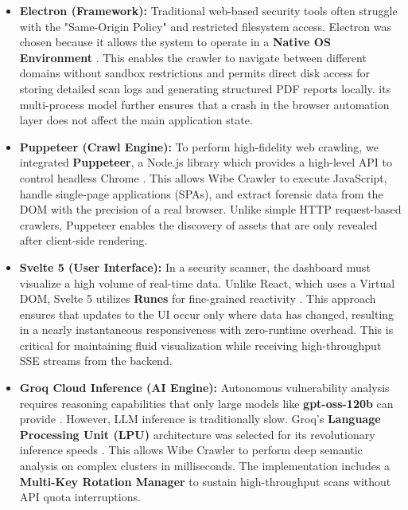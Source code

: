 \documentclass[12pt,oneside,a4paper]{book}
\begin{document}
\begin{itemize}
    \item \textbf{Electron (Framework):} Traditional web-based security tools often struggle with the "Same-Origin Policy" and restricted filesystem access. Electron was chosen because it allows the system to operate in a \textbf{Native OS Environment} \cite{electron2025}. This enables the crawler to navigate between different domains without sandbox restrictions and permits direct disk access for storing detailed scan logs and generating structured PDF reports locally. its multi-process model further ensures that a crash in the browser automation layer does not affect the main application state.
    
    \item \textbf{Puppeteer (Crawl Engine):} To perform high-fidelity web crawling, we integrated \textbf{Puppeteer}, a Node.js library which provides a high-level API to control headless Chrome \cite{puppeteer2025}. This allows Wibe Crawler to execute JavaScript, handle single-page applications (SPAs), and extract forensic data from the DOM with the precision of a real browser. Unlike simple HTTP request-based crawlers, Puppeteer enables the discovery of assets that are only revealed after client-side rendering.
    
    \item \textbf{Svelte 5 (User Interface):} In a security scanner, the dashboard must visualize a high volume of real-time data. Unlike React, which uses a Virtual DOM, Svelte 5 utilizes \textbf{Runes} for fine-grained reactivity \cite{svelte2025}. This approach ensures that updates to the UI occur only where data has changed, resulting in a nearly instantaneous responsiveness with zero-runtime overhead. This is critical for maintaining fluid visualization while receiving high-throughput SSE streams from the backend.
    
    \item \textbf{Groq Cloud Inference (AI Engine):} Autonomous vulnerability analysis requires reasoning capabilities that only large models like \textbf{gpt-oss-120b} can provide \cite{gptoss2025}. However, LLM inference is traditionally slow. Groq's \textbf{Language Processing Unit (LPU)} architecture was selected for its revolutionary inference speeds \cite{groq2025}. This allows Wibe Crawler to perform deep semantic analysis on complex clusters in milliseconds. The implementation includes a \textbf{Multi-Key Rotation Manager} to sustain high-throughput scans without API quota interruptions.
    

\end{itemize}
\end{document}

